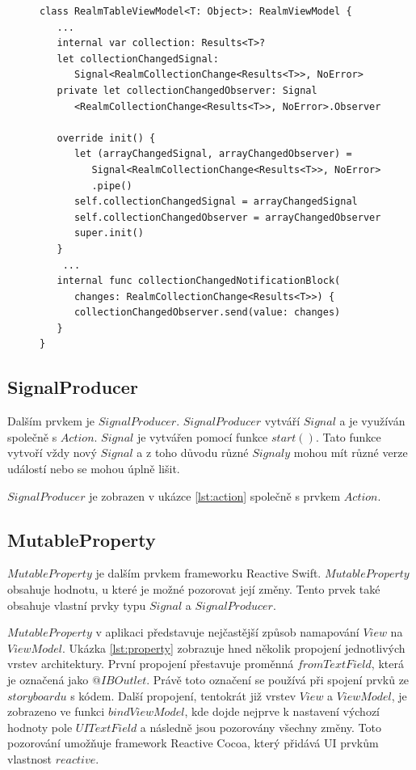\documentclass[thesis=M,czech]{FITthesis}[2012/06/26]
\begin{document}
\begin{figure}
\begin{minipage}{\linewidth}
\begin{lstlisting}[caption={Ukázka použití prvku Signal},label={lst:signal}]
class RealmTableViewModel<T: Object>: RealmViewModel {
   ...
   internal var collection: Results<T>?
   let collectionChangedSignal: 
      Signal<RealmCollectionChange<Results<T>>, NoError>
   private let collectionChangedObserver: Signal
      <RealmCollectionChange<Results<T>>, NoError>.Observer

   override init() {
      let (arrayChangedSignal, arrayChangedObserver) = 
         Signal<RealmCollectionChange<Results<T>>, NoError>
         .pipe()
      self.collectionChangedSignal = arrayChangedSignal
      self.collectionChangedObserver = arrayChangedObserver
      super.init()
   }
    ...
   internal func collectionChangedNotificationBlock(
      changes: RealmCollectionChange<Results<T>>) {
      collectionChangedObserver.send(value: changes)
   }
}
\end{lstlisting}
\end{minipage}
\end{figure}	

\subsection{SignalProducer}
Dalším prvkem je $SignalProducer$. $SignalProducer$ vytváří $Signal$ a je využíván společně s $Action$. $Signal$ je vytvářen pomocí funkce $start()$. Tato funkce vytvoří vždy nový $Signal$ a z toho důvodu různé $Signaly$ mohou mít různé verze událostí nebo se mohou úplně lišit. \cite{signalProducer}

$SignalProducer$ je zobrazen v ukázce \ref{lst:action} společně s prvkem $Action$.

\subsection{MutableProperty}
$MutableProperty$ je dalším prvkem frameworku Reactive Swift. $MutableProperty$ obsahuje hodnotu, u které je možné pozorovat její změny. Tento prvek také obsahuje vlastní prvky typu $Signal$ a $SignalProducer$. \cite{property}

$MutableProperty$ v aplikaci představuje nejčastější způsob namapování $View$ na $ViewModel$. Ukázka \ref{lst:property} zobrazuje hned několik propojení jednotlivých vrstev architektury. První propojení přestavuje proměnná $fromTextField$, která je označená jako $@IBOutlet$. Právě toto označení se používá při spojení prvků ze $storyboardu$ s kódem. Další propojení, tentokrát již vrstev $View$ a $ViewModel$, je zobrazeno ve funkci $bindViewModel$, kde dojde nejprve k nastavení výchozí hodnoty pole $UITextField$ a následně jsou pozorovány všechny změny. Toto pozorování umožňuje framework Reactive Cocoa, který přidává UI prvkům vlastnost $reactive$.
\end{document}
